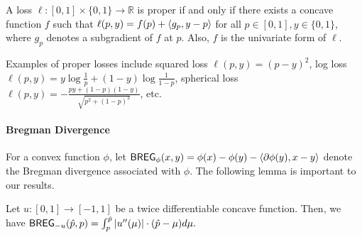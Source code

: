 \begin{lemma}\label{lem:characterization_proper_loss}
    A loss $\ell: [0, 1] \times \{0, 1\} \to \mathbb{R}$ is proper if and only if there exists a concave function $f$ such that $\ell(p, y) = f(p) + \left\langle g_p, y - p \right\rangle$ for all $p \in [0, 1], y \in \{0, 1\}$, where $g_{p}$ denotes a subgradient of $f$ at $p$.
    Also, $f$ is the univariate form of $\ell$.
\end{lemma}
Examples of proper losses include squared loss $\ell(p, y) = (p - y)^{2}$, log loss $\ell(p, y) = y\log\frac{1}{p} + (1-y)\log\frac{1}{1-p}$, spherical loss $\ell(p, y) = -\frac{p y + (1 - p) (1 - y)}{\sqrt{p ^ {2} + (1 - p) ^ {2}}}$, etc. 

\paragraph{Bregman Divergence} For a convex function $\phi$, let $\mathsf{BREG}_{\phi}(x, y) = \phi(x) - \phi(y) - \left\langle \partial \phi(y), x - y \right\rangle$ denote the Bregman divergence associated with $\phi$. 
The following lemma is important to our results.
\begin{lemma}\label{lem:relate_breg_vbreg}
    Let $u: [0, 1] \to [-1, 1]$ be a twice differentiable concave function. Then, we have
    $
        \mathsf{BREG}_{-u}(\hat{p}, p) = 
        \int_{p} ^ {\hat{p}} \left\lvert u''(\mu)\right\rvert \cdot (\hat{p} - \mu) d\mu.
    $
\end{lemma}

